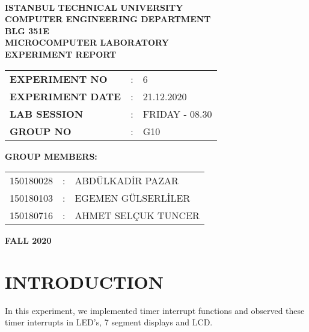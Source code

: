 \documentclass[pdftex,12pt,a4paper]{article}
\begin{document}
\begin{titlepage}
\begin{center}
\textbf{}\\
\textbf{\Large{ISTANBUL TECHNICAL UNIVERSITY}}\\
\vspace{0.5cm}
\textbf{\Large{COMPUTER ENGINEERING DEPARTMENT}}\\
\vspace{2cm}
\textbf{\Large{BLG 351E\\ MICROCOMPUTER LABORATORY\\ EXPERIMENT REPORT}}\\
\vspace{2.8cm}
\begin{table}[ht]
\centering
\Large{
\begin{tabular}{lcl}
\textbf{EXPERIMENT NO}  & : & 6 \\
\textbf{EXPERIMENT DATE}  & : & 21.12.2020 \\
\textbf{LAB SESSION}  & : & FRIDAY - 08.30 \\
\textbf{GROUP NO}  & : & G10 \\
\end{tabular}}
\end{table}
\vspace{1cm}
\textbf{\Large{GROUP MEMBERS:}}\\
\begin{table}[ht]
\centering
\Large{
\begin{tabular}{rcl}
150180028  & : & ABDÜLKADİR PAZAR\\
150180103  & : & EGEMEN GÜLSERLİLER \\
150180716  & : & AHMET SELÇUK TUNCER \\
\end{tabular}}
\end{table} 
\vspace{2.8cm}
\textbf{\Large{FALL 2020}}

\end{center}

\end{titlepage}

\thispagestyle{empty}
\setcounter{tocdepth}{4}
\tableofcontents
\clearpage

\setcounter{page}{1}

\section{INTRODUCTION}
In this experiment, we implemented timer interrupt functions and observed these timer interrupts in  LED's, 7 segment displays and LCD.
\end{document}
